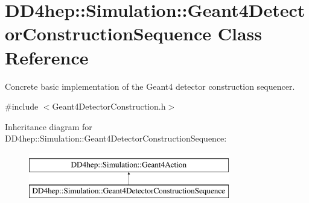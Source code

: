 \hypertarget{class_d_d4hep_1_1_simulation_1_1_geant4_detector_construction_sequence}{}\section{D\+D4hep\+:\+:Simulation\+:\+:Geant4\+Detector\+Construction\+Sequence Class Reference}
\label{class_d_d4hep_1_1_simulation_1_1_geant4_detector_construction_sequence}


Concrete basic implementation of the Geant4 detector construction sequencer.  




{\ttfamily \#include $<$Geant4\+Detector\+Construction.\+h$>$}

Inheritance diagram for D\+D4hep\+:\+:Simulation\+:\+:Geant4\+Detector\+Construction\+Sequence\+:\begin{figure}[H]
\begin{center}
\leavevmode
\includegraphics[height=2.000000cm]{class_d_d4hep_1_1_simulation_1_1_geant4_detector_construction_sequence}
\end{center}
\end{figure}
